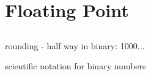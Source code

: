 \chapter{Floating Point}
\section{}

rounding - half way in binary: 1000...

scientific notation for binary numbers